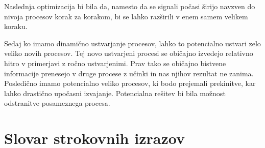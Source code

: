 Naslednja optimizacija bi bila da, namesto da se signali počasi širijo navzven do nivoja procesov korak za korakom, bi se lahko razširili v enem samem velikem koraku.

Sedaj ko imamo dinamično ustvarjanje procesov, lahko to potencialno ustvari zelo veliko novih procesov. Tej novo ustvarjeni procesi se običajno izvedejo relativno hitro v primerjavi z ročno ustvarjenimi. Prav tako se običajno bistvene informacije prenesejo v druge procese z učinki in nas njihov rezultat ne zanima. Posledično imamo potencialno veliko procesov, ki bodo prejemali prekinitve, kar lahko drastično upočasni izvajanje. Potencialna rešitev bi bila možnost odstranitve posameznega procesa.

\section*{Slovar strokovnih izrazov}





